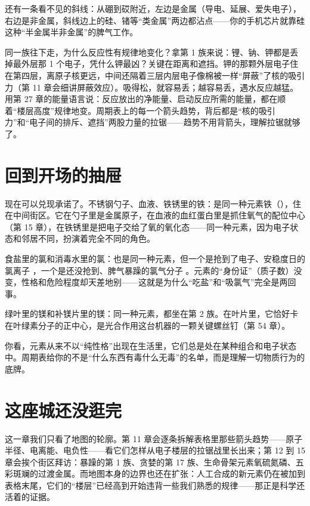 还有一条看不见的斜线：从硼到砹附近，左边是金属（导电、延展、爱失电子），右边是非金属，斜线边上的硅、锗等“类金属”两边都沾点——你的手机芯片就靠硅这种“半金属半非金属”的脾气工作。

\begin{qiaoliang}
同一族往下走，为什么反应性有规律地变化？拿第 1 族来说：锂、钠、钾都是丢掉最外层那 1 个电子，凭什么钾最凶？关键在距离和遮挡。钾的那颗外层电子住在第四层，离原子核更远，中间还隔着三层内层电子像棉被一样“屏蔽”了核的吸引力（第 11 章会细讲屏蔽效应）。吸得松，就容易丢；越容易丢，遇水反应越猛。用第 27 章的能量语言说：反应放出的净能量、启动反应所需的能量，都在顺着“楼层高度”规律地变。周期表上的每一个箭头趋势，背后都是“核的吸引力”和“电子间的排斥、遮挡”两股力量的拉锯——趋势不用背箭头，理解拉锯就够了。
\end{qiaoliang}

\section{回到开场的抽屉}

现在可以兑现承诺了。不锈钢勺子、血液、铁锈里的铁：是同一种元素铁（），住在中间街区。它在勺子里是金属原子，在血液的血红蛋白里是抓住氧气的配位中心（第 15 章），在铁锈里是把电子交给了氧的氧化态——同一种元素，因为电子状态和邻居不同，扮演着完全不同的角色。

食盐里的氯和消毒水里的氯：也是同一种元素，但一个是抢到了电子、安稳度日的氯离子 ，一个是还没抢到、脾气暴躁的氯气分子 。元素的“身份证”（质子数）没变，性格和危险程度却天差地别——这就是为什么“吃盐”和“吸氯气”完全是两回事。

绿叶里的镁和补镁片里的镁：同一种元素，都坐在第 2 族。在叶片里，它恰好卡在叶绿素分子的正中心，是光合作用这台机器的一颗关键螺丝钉（第 54 章）。

你看，元素从来不以“纯性格”出现在生活里，它们总是处在某种组合和电子状态中。周期表给你的不是“什么东西有毒什么无毒”的名单，而是理解一切物质行为的底牌。

\section{这座城还没逛完}

这一章我们只看了地图的轮廓。第 11 章会逐条拆解表格里那些箭头趋势——原子半径、电离能、电负性——看它们怎样从电子楼层的拉锯战里长出来；第 12 到 15 章会挨个街区拜访：暴躁的第 1 族、贪婪的第 17 族、生命骨架元素氧硫氮磷、五彩斑斓的过渡金属。而地图本身的边界也还在扩张：人工合成的新元素仍在被加到表格末尾，它们的“楼层”已经高到开始违背一些我们熟悉的规律——那正是科学还活着的证据。


